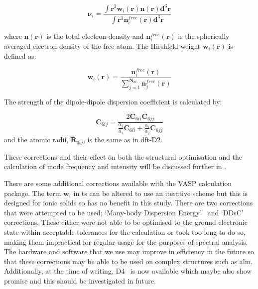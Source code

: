 \begin{equation}
\boldsymbol{\nu}_i = \frac{\int \boldsymbol{r}^3 \boldsymbol{w}_i (\mathbf{r}) \boldsymbol{n} (\mathbf{r}) \boldsymbol{d}^3\mathbf{r}}{\int \boldsymbol{r}^3 \boldsymbol{n}_i^{free}(\mathbf{r}) \boldsymbol{d}^3 \mathbf{r}}
\end{equation}

where \(\boldsymbol{n}(\mathbf{r})\) is the total electron density and \(\boldsymbol{n}_i^{free}(\mathbf{r})\) is the spherically averaged electron density of the free atom. The Hirshfeld weight \(\boldsymbol{w}_i (\mathbf{r})\) is defined as:

\begin{equation}
\boldsymbol{w}_i (\mathbf{r}) = \frac{\boldsymbol{n}_i^{free}(\mathbf{r})}{\sum_{j=1}^{\boldsymbol{N}_{at}} \boldsymbol{n}_j^{free} (\mathbf{r})}
\end{equation}
    
The strength of the dipole-dipole dispersion coefficient is calculated by:

\begin{equation}
\boldsymbol{C}_{6ij} = \frac{2 \boldsymbol{C}_{6ii} \boldsymbol{C}_{6jj}}{{\frac{\alpha_j}{\alpha_i}} \boldsymbol{C}_{6ii} + \frac{\alpha_i}{\alpha_j} \boldsymbol{C}_{6jj}}
\end{equation}
and the atomic radii, \( \boldsymbol{R}_{0ij} \), is the same as in \acrshort{dft}-D2.

These corrections and their effect on both the structural optimisation and the calculation of mode frequency and intensity will be discussed further in .

There are some additional corrections available with the VASP calculation package. The term \(\boldsymbol{w}_i\) in \acrshort{ts} can be altered to use an iterative scheme but this is designed for ionic solids so has no benefit in this study. There are two corrections that were attempted to be used; `Many-body Dispersion Energy'~\cite{PhysRevLett.108.236402} and `DDsC'~\cite{Steinmann2011} corrections. These either were not able to be optimised to the ground electronic state within acceptable tolerances for the calculation or took too long to do so, making them impractical for regular usage for the purposes of spectral analysis. The hardware and software that we use may improve in efficiency in the future so that these corrections may be able to be used on complex structures such as \acrshort{alm}. Additionally, at the time of writing, D4~\cite{Caldeweyher2017} is now available which maybe also show promise and this should be investigated in future. 

